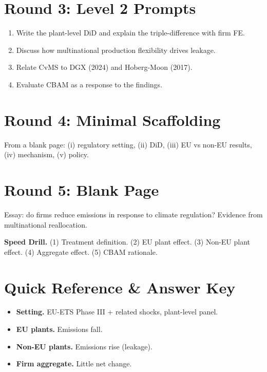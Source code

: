 \documentclass[11pt]{article}
\begin{document}
\section*{Round 3: Level 2 Prompts}
\begin{enumerate}
\item Write the plant-level DiD and explain the triple-difference with firm FE.
\item Discuss how multinational production flexibility drives leakage.
\item Relate CvMS to DGX (2024) and Hoberg-Moon (2017).
\item Evaluate CBAM as a response to the findings.
\end{enumerate}

\section*{Round 4: Minimal Scaffolding}
From a blank page: (i) regulatory setting, (ii) DiD, (iii) EU vs non-EU results, (iv) mechanism, (v) policy.

\section*{Round 5: Blank Page}
Essay: do firms reduce emissions in response to climate regulation? Evidence from multinational reallocation.

\vspace{6pt}
\begin{drillbox}
\textbf{Speed Drill.} (1) Treatment definition. (2) EU plant effect. (3) Non-EU plant effect. (4) Aggregate effect. (5) CBAM rationale.
\end{drillbox}

\section*{Quick Reference \& Answer Key}
\begin{answerbox}
\begin{itemize}
\item \textbf{Setting.} EU-ETS Phase III + related shocks, plant-level panel.
\item \textbf{EU plants.} Emissions fall.
\item \textbf{Non-EU plants.} Emissions rise (leakage).
\item \textbf{Firm aggregate.} Little net change.
\end{itemize}
\end{answerbox}
\end{document}
